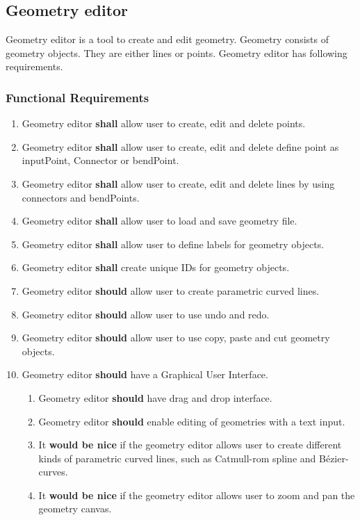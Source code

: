 \subsection{Geometry editor}
\label{sec:sf-geometry}

Geometry editor is a tool to create and edit geometry. Geometry consists of geometry objects. They are either lines or points. Geometry editor has following requirements.

\subsubsection{Functional Requirements}

\begin{enumerate}
	\item Geometry editor \textbf{shall} allow user to create, edit and delete points.
	\item Geometry editor \textbf{shall} allow user to create, edit and delete define point as inputPoint, Connector or bendPoint.
	\item Geometry editor \textbf{shall} allow user to create, edit and delete lines by using connectors and bendPoints.
	\item Geometry editor \textbf{shall} allow user to load and save geometry file.
	\item Geometry editor \textbf{shall} allow user to define labels for geometry objects.
	\item Geometry editor \textbf{shall} create unique IDs for geometry objects.
	\item Geometry editor \textbf{should} allow user to create parametric curved lines.
	\item Geometry editor \textbf{should} allow user to use undo and redo.
	\item Geometry editor \textbf{should} allow user to use copy, paste and cut geometry objects.
	\item Geometry editor \textbf{should} have a Graphical User Interface.
	\begin{enumerate}
		\item Geometry editor \textbf{should} have drag and drop interface.
		\item Geometry editor \textbf{should} enable editing of geometries with a text input.
		\item It \textbf{would be nice} if the geometry editor allows user to create different kinds of parametric curved lines, such as Catmull-rom spline and Bézier-curves.
		\item It \textbf{would be nice} if the geometry editor allows user to zoom and pan the geometry canvas.

\end{enumerate}
\end{enumerate}
